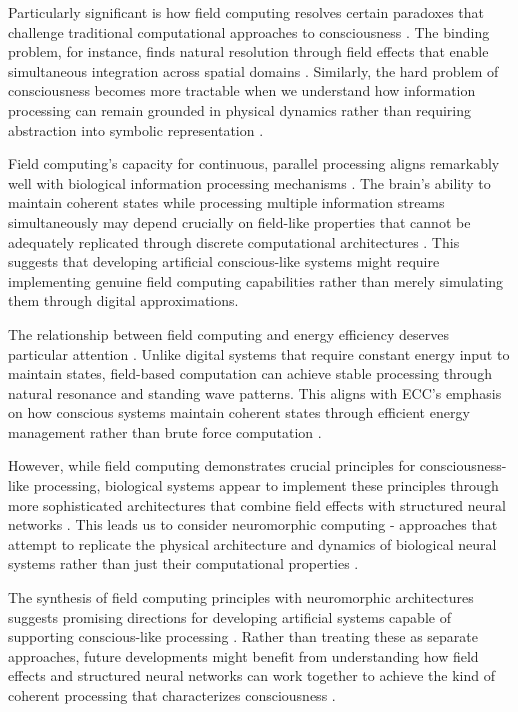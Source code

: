 \begin{refsection}
Particularly significant is how field computing resolves certain paradoxes that challenge traditional computational approaches to consciousness \cite{Bandyopadhyay2020}. The binding problem, for instance, finds natural resolution through field effects that enable simultaneous integration across spatial domains \cite{McFadden2002}. Similarly, the hard problem of consciousness becomes more tractable when we understand how information processing can remain grounded in physical dynamics rather than requiring abstraction into symbolic representation \cite{Calude2018b}.

Field computing's capacity for continuous, parallel processing aligns remarkably well with biological information processing mechanisms \cite{Chua2017}. The brain's ability to maintain coherent states while processing multiple information streams simultaneously may depend crucially on field-like properties that cannot be adequately replicated through discrete computational architectures \cite{Fromherz2019}. This suggests that developing artificial conscious-like systems might require implementing genuine field computing capabilities rather than merely simulating them through digital approximations.

The relationship between field computing and energy efficiency deserves particular attention \cite{Haken2020}. Unlike digital systems that require constant energy input to maintain states, field-based computation can achieve stable processing through natural resonance and standing wave patterns. This aligns with ECC's emphasis on how conscious systems maintain coherent states through efficient energy management rather than brute force computation \cite{McFadden2018}.

However, while field computing demonstrates crucial principles for consciousness-like processing, biological systems appear to implement these principles through more sophisticated architectures that combine field effects with structured neural networks \cite{Nikolic2019}. This leads us to consider neuromorphic computing - approaches that attempt to replicate the physical architecture and dynamics of biological neural systems rather than just their computational properties \cite{Pockett2021}.

The synthesis of field computing principles with neuromorphic architectures suggests promising directions for developing artificial systems capable of supporting conscious-like processing \cite{Pribram2017}. Rather than treating these as separate approaches, future developments might benefit from understanding how field effects and structured neural networks can work together to achieve the kind of coherent processing that characterizes consciousness \cite{Raychowdhury2020}.


\end{refsection}
